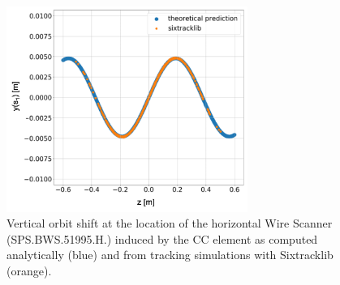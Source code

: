 \begin{figure}[!h]
    \centering         
    \includegraphics[width=0.7\textwidth]{images/Ch6/Vcc_orbit_shfit_sixtracklib_sanity_check.png}
        \caption{Vertical orbit shift at the location of the horizontal Wire Scanner (SPS.BWS.51995.H.) induced by the CC element as computed analytically (blue) and from tracking simulations with Sixtracklib (orange).}
        \label{fig:sixtracklib_CC_orbit_shift_vs_theory}
\end{figure}

